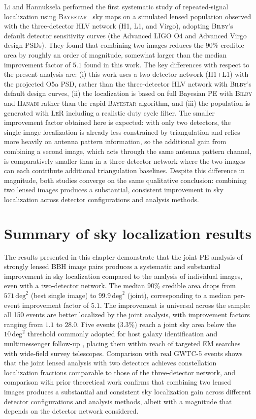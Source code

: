 Li and Hannuksela \cite{Hannuksela_skyloc} performed the first systematic study of repeated-signal localization using \textsc{Bayestar}~\cite{SingerPrice2016} sky maps on a simulated lensed population observed with the three-detector HLV network (H1, L1, and Virgo), adopting \textsc{Bilby}'s default detector sensitivity curves (the Advanced LIGO O4 and Advanced Virgo design PSDs). They found that combining two images reduces the 90\% credible area by roughly an order of magnitude, somewhat larger than the median improvement factor of $5.1$ found in this work. The key differences with respect to the present analysis are: (i) this work uses a two-detector network (H1+L1) with the projected O5a PSD, rather than the three-detector HLV network with \textsc{Bilby}'s default design curves, (ii) the localization is based on full Bayesian PE with \textsc{Bilby} and \textsc{Hanabi} rather than the rapid \textsc{Bayestar} algorithm, and (iii) the population is generated with \textsc{LeR} including a realistic duty cycle filter. The smaller improvement factor obtained here is expected: with only two detectors, the single-image localization is already less constrained by triangulation and relies more heavily on antenna pattern information, so the additional gain from combining a second image, which acts through the same antenna pattern channel, is comparatively smaller than in a three-detector network where the two images can each contribute additional triangulation baselines. Despite this difference in magnitude, both studies converge on the same qualitative conclusion: combining two lensed images produces a substantial, consistent improvement in sky localization across detector configurations and analysis methods.

\section{Summary of sky localization results}
\label{sec:skyloc_summary}

The results presented in this chapter demonstrate that the joint PE analysis of strongly lensed BBH image pairs produces a systematic and substantial improvement in sky localization compared to the analysis of individual images, even with a two-detector network. The median 90\% credible area drops from $571\,\mathrm{deg}^2$ (best single image) to $99.9\,\mathrm{deg}^2$ (joint), corresponding to a median per-event improvement factor of $5.1$. The improvement is universal across the sample: all 150 events are better localized by the joint analysis, with improvement factors ranging from $1.1$ to $28.0$. Five events ($3.3\%$) reach a joint sky area below the $10\,\mathrm{deg}^2$ threshold commonly adopted for host galaxy identification and multimessenger follow-up \cite{Abbott2020Prospects}, placing them within reach of targeted EM searches with wide-field survey telescopes. Comparison with real GWTC-5 events shows that the joint lensed analysis with two detectors achieves constellation localization fractions comparable to those of the three-detector network, and comparison with prior theoretical work confirms that combining two lensed images produces a substantial and consistent sky localization gain across different detector configurations and analysis methods, albeit with a magnitude that depends on the detector network considered.